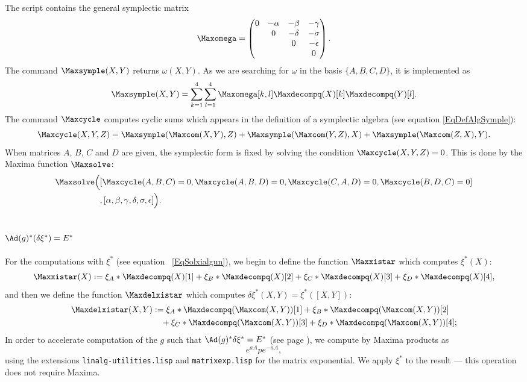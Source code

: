 The script  contains the general symplectic matrix
\[
	\Maxomega=\begin{pmatrix}
		0 & -\alpha & -\beta  & -\gamma   \\
		  & 0       & -\delta & -\sigma   \\
		  &         & 0       & -\epsilon \\
		  &         &         & 0
	\end{pmatrix}.
\]
The command $\Maxsymple(X,Y)$ returns $\omega(X,Y)$. As we are searching for $\omega$ in the basis $\{ A,B,C,D \}$, it is implemented as
\[
	\Maxsymple(X,Y)=\sum_{k=1}^{4}\sum_{l=1}^{4}\Maxomega[k,l]\Maxdecompq(X)[k]\Maxdecompq(Y)[l].
\]
The command $\Maxcycle$ computes cyclic sums which appears in the definition of a symplectic algebra (see equation \eqref{EqDefAlgSymple}):
\begin{equation}
	\Maxcycle(X,Y,Z)=\Maxsymple(\Maxcom(X,Y),Z)+\Maxsymple(\Maxcom(Y,Z),X)+\Maxsymple(\Maxcom(Z,X),Y).
\end{equation}
When matrices $A$, $B$, $C$ and $D$ are given, the symplectic form is fixed by solving the condition $\Maxcycle(X,Y,Z)=0$. This is done by the Maxima function $\Maxsolve$:
\[
	\begin{split}
		\Maxsolve\Big(&  [\Maxcycle(A,B,C)=0,\Maxcycle(A,B,D)=0,\Maxcycle(C,A,D)=0,\Maxcycle(B,D,C)=0]\\
		&,[\alpha,\beta,\gamma,\delta,\sigma,\epsilon] \Big).
	\end{split}
\]

\subsection{\texorpdfstring{$\Ad(g)^*(\delta\xi^*)=E^*$}{AdgxiE}}

For the computations with $\xi^*$ (see equation ~\ref{EqSolxialgun}), we begin to define the function $\Maxxistar$ which computes $\xi^*(X)$:
\[
	\Maxxistar(X):=\xi_{A}*\Maxdecompq(X)[1]+\xi_{B}*\Maxdecompq(X)[2]+\xi_{C}*\Maxdecompq(X)[3]+\xi_{D}*\Maxdecompq(X)[4],
\]
and then we define the function $\Maxdelxistar$ which computes $\delta\xi^*(X,Y)=\xi^*([X,Y])$:
\[
	\begin{split}
		\Maxdelxistar(X,Y)&:=\xi_{A}*\Maxdecompq(\Maxcom(X,Y))[1]+\xi_{B}*\Maxdecompq(\Maxcom(X,Y))[2]\\
		&\quad+\xi_{C}*\Maxdecompq(\Maxcom(X,Y))[3]+\xi_{D}*\Maxdecompq(\Maxcom(X,Y))[4];
	\end{split}
\]
In order to accelerate computation of  the $g$ such that $\Ad(g)^*\delta\xi^*=E^*$ (see page \pageref{PgAdgXEbbekl}), we compute by Maxima products as
\[
	e^{aA}p e^{-aA},
\]
using the extensions \texttt{linalg-utilities.lisp} and \texttt{matrixexp.lisp} for the matrix exponential. We apply $\xi^*$ to the result --- this operation does not require Maxima.
